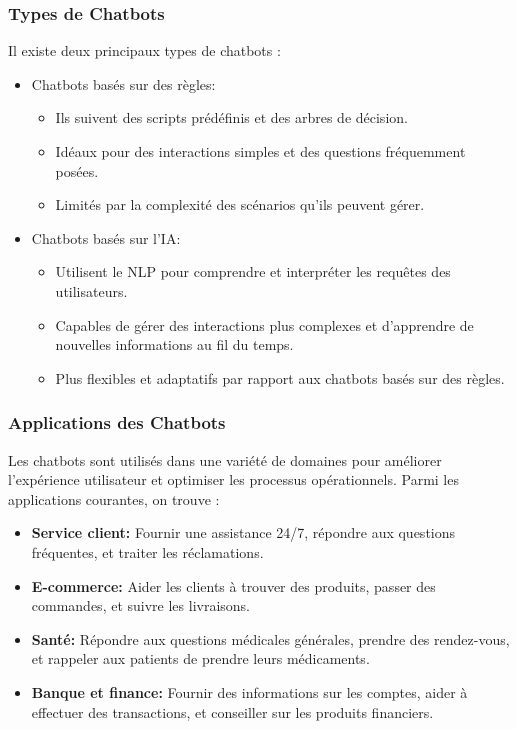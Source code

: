\subsubsection{Types de Chatbots}

\hspace{16pt}Il existe deux principaux types de chatbots :
\begin{itemize}
  \item Chatbots basés sur des règles:
  \begin{itemize}
    \item Ils suivent des scripts prédéfinis et des arbres de décision.
    \item Idéaux pour des interactions simples et des questions fréquemment posées.
    \item Limités par la complexité des scénarios qu'ils peuvent gérer.
  \end{itemize}
  
  \item Chatbots basés sur l'IA:
  \begin{itemize}
    \item Utilisent le NLP pour comprendre et interpréter les requêtes des utilisateurs.
    \item Capables de gérer des interactions plus complexes et d'apprendre de nouvelles informations au fil du temps.
    \item Plus flexibles et adaptatifs par rapport aux chatbots basés sur des règles.
  \end{itemize}
\end{itemize}

\subsubsection{Applications des Chatbots}
\hspace{16pt}Les chatbots sont utilisés dans une variété de domaines pour améliorer l'expérience utilisateur et optimiser les processus opérationnels. Parmi les applications courantes, on trouve :

\begin{itemize}
  \item \textbf{Service client: }Fournir une assistance 24/7, répondre aux questions fréquentes, et traiter les réclamations.
  \item \textbf{E-commerce: }Aider les clients à trouver des produits, passer des commandes, et suivre les livraisons.
  \item \textbf{Santé: }Répondre aux questions médicales générales, prendre des rendez-vous, et rappeler aux patients de prendre leurs médicaments.
  \item \textbf{Banque et finance: }Fournir des informations sur les comptes, aider à effectuer des transactions, et conseiller sur les produits financiers.
\end{itemize}


